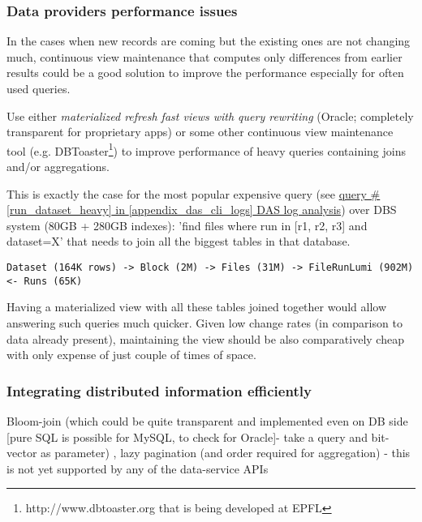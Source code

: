 \subsubsection*{Data providers performance issues}
In the cases when new records are coming but the existing ones are not changing much, continuous view maintenance that computes only differences from earlier results could be a good solution to improve the performance especially for often used queries. 

Use either \textit{materialized refresh fast views with query rewriting} (Oracle; completely transparent for proprietary apps)\cite{Oracle11}
 or some other continuous view maintenance tool (e.g. DBToaster\footnote{http://www.dbtoaster.org that is being developed at EPFL}) to improve performance of heavy queries containing joins and/or aggregations.

This is exactly the case for the most popular expensive query (see \hyperref[run_dataset_heavy]{query \#\ref{run_dataset_heavy} in \ref{appendix_das_cli_logs} DAS log analysis}) over DBS system (80GB + 280GB indexes): 'find files where run in [r1, r2, r3] and dataset=X' that needs to join all the biggest tables in that database.

\begin{verbatim}
Dataset (164K rows) -> Block (2M) -> Files (31M) -> FileRunLumi (902M) <- Runs (65K)
\end{verbatim}

Having a materialized view with all these tables joined together would allow answering such queries much quicker. Given low change rates (in comparison to data already present), maintaining the view should be also comparatively cheap with only expense of just couple of times of space.



\subsubsection*{Integrating distributed information efficiently}
Bloom-join (which could be quite transparent and implemented even on DB side [pure SQL is possible for MySQL, to check for Oracle]- take a query and bit-vector as parameter) , lazy pagination (and order required for aggregation) - this is not yet supported by any of the data-service APIs


